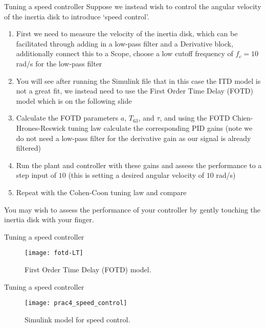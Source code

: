 \documentclass[9pt]{beamer-control}
\begin{document}

\begin{frame}{Tuning a speed controller}
Suppose we instead wish to control the angular velocity of the inertia disk to introduce `speed control'. 

\begin{enumerate}
	\item First we need to measure the velocity of the inertia disk, which can be facilitated through adding in a low-pass filter and a Derivative block, additionally connect this to a Scope, choose a low cutoff frequency of $f_c=10$ rad/s for the low-pass filter
	\item You will see after running the Simulink file that in this case the ITD model is not a great fit, we instead need to use the First Order Time Delay (FOTD) model which is on the following slide
	\item Calculate the FOTD parameters $a$, $T_{63}$, and $\tau$, and using the FOTD Chien-Hrones-Reswick tuning law calculate the corresponding PID gains (note we do not need a low-pass filter for the derivative gain as our signal is already filtered)
	\item Run the plant and controller with these gains and assess the performance to a step input of $10$ (this is setting a desired angular velocity of $10$ rad/s)
	\item Repeat with the Cohen-Coon tuning law and compare
\end{enumerate}

You may wish to assess the performance of your controller by gently touching the inertia disk with your finger. 

\end{frame}

\begin{frame}{Tuning a speed controller}
	\begin{figure}
	\centering
	\texttt{[image: fotd-LT]}
	\caption{First Order Time Delay (FOTD) model.}
\end{figure}
\end{frame}

\begin{frame}{Tuning a speed controller}
	\begin{figure}
		\centering
		\texttt{[image: prac4\_speed\_control]}
		\caption{Simulink model for speed control.}
	\end{figure}
\end{frame}
\end{document}
